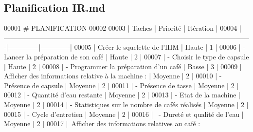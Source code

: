 \hypertarget{_planification_01_i_r_8md_source}{}\subsection{Planification I\+R.\+md}

\begin{DoxyCode}
00001 # PLANIFICATION
00002 
00003 | Taches                                                                                              
              |   Priorité   |  Itération  |
00004 
      |-------------------------------------------------------------------------------------------------------------|--------------|-------------|
00005 | Créer le squelette de l'IHM                                                                         
              |    Haute     |      1      |
00006 | - Lancer la préparation de son café                                                                 
              |    Haute     |      2      |
00007 | - Choisir le type de capsule                                                                        
              |    Haute     |      2      |
00008 | - Programmer la préparation d'un café                                                               
              |    Basse     |      3      |
00009 | Afficher des informations relative à la machine :                                                   
              |   Moyenne    |      2      |
00010 |   - Présence de capsule                                                                             
              |   Moyenne    |      2      |
00011 |   - Présence de tasse                                                                               
              |   Moyenne    |      2      |
00012 |   - Quantité d'eau restante                                                                         
              |   Moyenne    |      2      |
00013 |   - Etat de la machine                                                                              
              |   Moyenne    |      2      |
00014 |   - Statistiques sur le nombre de cafés réalisés                                                    
              |   Moyenne    |      2      |
00015 |   - Cycle d’entretien                                                                               
              |   Moyenne    |      2      |
00016 |   - Dureté et qualité de l'eau                                                                      
              |   Moyenne    |      2      |
00017 | Afficher des informations relatives au café :                                                       

\end{DoxyCode}
